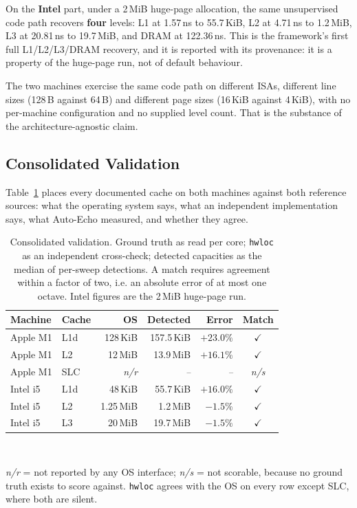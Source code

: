 \documentclass[conference]{IEEEtran}
\newcommand{\cmark}{\ensuremath{\checkmark}}
\begin{document}
On the \textbf{Intel} part, under a 2\,MiB huge-page allocation, the same
unsupervised code path recovers \textbf{four} levels: L1 at 1.57\,ns to
55.7\,KiB, L2 at 4.71\,ns to 1.2\,MiB, L3 at 20.81\,ns to 19.7\,MiB, and DRAM at
122.36\,ns. This is the framework's first full L1/L2/L3/DRAM recovery, and it is
reported with its provenance: it is a property of the huge-page run, not of
default behaviour.

The two machines exercise the same code path on different ISAs, different line
sizes (128\,B against 64\,B) and different page sizes (16\,KiB against 4\,KiB),
with no per-machine configuration and no supplied level count. That is the
substance of the architecture-agnostic claim.

\subsection{Consolidated Validation}

Table~\ref{tab:validation} places every documented cache on both machines against
both reference sources: what the operating system says, what an independent
implementation says, what Auto-Echo measured, and whether they agree.

\begin{table}[t]
\caption{Consolidated validation. Ground truth as read per core; \texttt{hwloc}
as an independent cross-check; detected capacities as the median of per-sweep
detections. A match requires agreement within a factor of two, i.e. an absolute
error of at most one octave. Intel figures are the 2\,MiB huge-page run.}
\label{tab:validation}
\centering
\footnotesize
\begin{tabular}{@{}llrrrc@{}}
\toprule
\textbf{Machine} & \textbf{Cache} & \textbf{OS} & \textbf{Detected} &
\textbf{Error} & \textbf{Match} \\
\midrule
Apple M1 & L1d  & 128\,KiB   & 157.5\,KiB & $+23.0\%$ & \cmark \\
Apple M1 & L2   & 12\,MiB    & 13.9\,MiB  & $+16.1\%$ & \cmark \\
Apple M1 & SLC  & \emph{n/r} & \emph{--}  & \emph{--} & \emph{n/s} \\
Intel i5 & L1d  & 48\,KiB    & 55.7\,KiB  & $+16.0\%$ & \cmark \\
Intel i5 & L2   & 1.25\,MiB  & 1.2\,MiB   & $-1.5\%$  & \cmark \\
Intel i5 & L3   & 20\,MiB    & 19.7\,MiB  & $-1.5\%$  & \cmark \\
\bottomrule
\end{tabular}
\\[2pt]
\raggedright\footnotesize
\emph{n/r} = not reported by any OS interface; \emph{n/s} = not scorable, because
no ground truth exists to score against. \texttt{hwloc} agrees with the OS on
every row except SLC, where both are silent.
\end{table}
\end{document}
